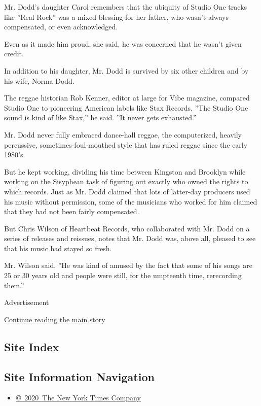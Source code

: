 Mr. Dodd's daughter Carol remembers that the ubiquity of Studio One
tracks like ''Real Rock'' was a mixed blessing for her father, who
wasn't always compensated, or even acknowledged.

Even as it made him proud, she said, he was concerned that he wasn't
given credit.

In addition to his daughter, Mr. Dodd is survived by six other children
and by his wife, Norma Dodd.

The reggae historian Rob Kenner, editor at large for Vibe magazine,
compared Studio One to pioneering American labels like Stax Records.
''The Studio One sound is kind of like Stax,'' he said. ''It never gets
exhausted.''

Mr. Dodd never fully embraced dance-hall reggae, the computerized,
heavily percussive, sometimes-foul-mouthed style that has ruled reggae
since the early 1980's.

But he kept working, dividing his time between Kingston and Brooklyn
while working on the Sisyphean task of figuring out exactly who owned
the rights to which records. Just as Mr. Dodd claimed that lots of
latter-day producers used his music without permission, some of the
musicians who worked for him claimed that they had not been fairly
compensated.

But Chris Wilson of Heartbeat Records, who collaborated with Mr. Dodd on
a series of releases and reissues, notes that Mr. Dodd was, above all,
pleased to see that his music had stayed so fresh.

Mr. Wilson said, ''He was kind of amused by the fact that some of his
songs are 25 or 30 years old and people were still, for the umpteenth
time, rerecording them.''

Advertisement

\protect\hyperlink{after-bottom}{Continue reading the main story}

\hypertarget{site-index}{%
\subsection{Site Index}\label{site-index}}

\hypertarget{site-information-navigation}{%
\subsection{Site Information
Navigation}\label{site-information-navigation}}

\begin{itemize}
\tightlist
\item
  \href{https://help.nytimes.com/hc/en-us/articles/115014792127-Copyright-notice}{©~2020~The
  New York Times Company}
\end{itemize}

